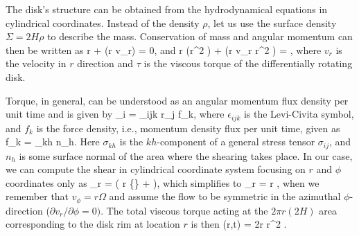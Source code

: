 The disk's structure can be obtained from the hydrodynamical equations in cylindrical coordinates.
Instead of the density $\rho$, let us use the surface density $\Sigma = 2 H \rho$ to describe the mass. %
Conservation of mass and angular momentum can then be written as\cite[see e.g.,][]{Cho98, FKR02}
\be\label{eq:disk_1}
r  + (r \Sigma v_r) = 0,
\ee
and
\be\label{eq:disk_2}
r (\Sigma r^2 \Omega) +  (r \Sigma v_r r^2 \Omega) =  ,
\ee
where $v_r$ is the velocity in $r$ direction and $\tau$ is the viscous torque of the differentially rotating disk.

Torque, in general, can be understood as an angular momentum flux density per unit time and is given by
\be
\tau_i = \epsilon_{ijk} r_j f_k,
\ee
where $\epsilon_{ijk}$ is the Levi-Civita symbol, and $f_k$ is the force density, i.e., momentum density flux per unit time, given as
\be
f_k = \sigma_{kh} n_h.
\ee
Here $\sigma_{kh}$ is the $kh$-component of a general stress tensor $\sigma_{ij}$, and $n_h$ is some surface normal of the area where the shearing takes place.
In our case, we can compute the shear in cylindrical coordinate system focusing on $r$ and $\phi$ coordinates only as\cite[see e.g.,][]{Cho98}
\be
\sigma_{r\phi} = \rho \nu \left( r  \left\{\right\} +   \right),
\ee
which simplifies to 
\be
\sigma_{r\phi} = \rho \nu r ,
\ee
when we remember that $v_{\phi} = r \Omega$ and assume the flow to be symmetric in the azimuthal $\phi$-direction ($\partial v_r/\partial \phi = 0)$.
The total viscous torque acting at the $2\pi r (2 H)$ area corresponding to the disk rim at location $r$ is then
\be
\tau(r,t) = 2\pi r \nu \Sigma r^2 .
\ee

